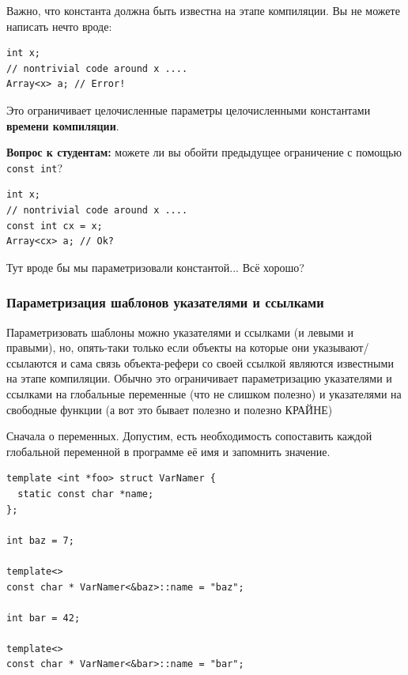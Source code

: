 \documentclass[a4paper,12pt,oneside]{article}
\newif\ifanswers
\begin{document}
Важно, что константа должна быть известна на этапе компиляции. Вы не можете написать нечто вроде:

\begin{lstlisting}
int x;
// nontrivial code around x ....
Array<x> a; // Error!
\end{lstlisting}

Это ограничивает целочисленные параметры целочисленными константами \textbf{времени компиляции}.

\textbf{Вопрос к студентам:} можете ли вы обойти предыдущее ограничение с помощью \lstinline!const int!?

\begin{lstlisting}
int x;
// nontrivial code around x ....
const int cx = x;
Array<cx> a; // Ok?
\end{lstlisting}

Тут вроде бы мы параметризовали константой... Всё хорошо?

\ifanswers
Правильный ответ: нет, всё плохо. Несмотря на то, что \lstinline!cx! является константной переменной в смысле ограниченного доступа, она не является константой времени компиляции. Больше об этом см. (\ref{Constexpr}).
\fi

\subsubsection{Параметризация шаблонов указателями и ссылками}\label{PointerTemplateArguments}

Параметризовать шаблоны можно указателями и ссылками (и левыми и правыми), но, опять-таки только если объекты на которые они указывают/ссылаются и сама связь объекта-рефери со своей ссылкой являются известными на этапе компиляции. Обычно это ограничивает параметризацию указателями и ссылками на глобальные переменные (что не слишком полезно) и указателями на свободные функции (а вот это бывает полезно и полезно КРАЙНЕ)

Сначала о переменных. Допустим, есть необходимость сопоставить каждой глобальной переменной в программе её имя и запомнить значение.

\begin{lstlisting}
template <int *foo> struct VarNamer {
  static const char *name;
};

int baz = 7;

template<>
const char * VarNamer<&baz>::name = "baz";

int bar = 42;

template<>
const char * VarNamer<&bar>::name = "bar";
\end{lstlisting}
\end{document}
